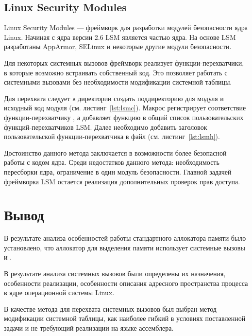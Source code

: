 \subsection{Linux Security Modules}

Linux Security Modules --- фреймворк для разработки модулей безопасности ядра Linux. Начиная с ядра версии 2.6 LSM является частью ядра. На основе LSM разработаны AppArmor, SELinux и некоторые другие модули безопасности.

Для некоторых системных вызовов фреймворк реализует функции-перехватчики, в которые возможно встраивать собственный код. Это позволяет работать с системными вызовами без необходимости модификации системной таблицы.

Для перехвата  следует в директории  создать поддиректорию для модуля и исходный код модуля (см. листинг~\ref{lst:lsmc}). Макрос  регистрирует соответствие  функции-перехватчику , а  добавляет функцию в общий список пользовательских функций-перехватчиков LSM. Далее необходимо добавить заголовок пользовательской функции-перехватчика в файл  (см. листинг~\ref{lst:lsmh}).





Достоинство данного метода заключается в возможности более безопасной работы с кодом ядра. Среди недостатков данного метода: необходимость пересборки ядра, ограничение в один модуль безопасности. Главной задачей фреймворка LSM остается реализация дополнительных проверок прав доступа.

\section{Вывод}

В результате анализа особенностей работы стандартного аллокатора памяти было установлено, что аллокатор для выделения памяти использует системные вызовы  и .

В результате анализа системных вызовов были определены их назначения, особенности реализации, особенности описания адресного пространства процесса в ядре операционной системы Linux.

В качестве метода для перехвата системных вызовов был выбран метод модификации системной таблицы, как наиболее гибкий в условиях поставленной задачи и не требующий реализации на языке ассемблера.
